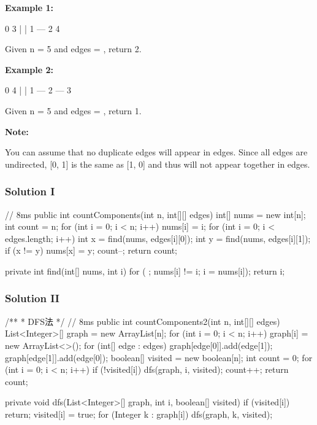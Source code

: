 \textbf{Example 1:}
\begin{Code}
     0          3
     |          |
     1 --- 2    4
\end{Code}

Given n = 5 and edges = \code{[[0, 1], [1, 2], [3, 4]]}, return 2.

\textbf{Example 2:}

\begin{Code}
     0           4
     |           |
     1 --- 2 --- 3
\end{Code}

Given n = 5 and edges = \code{[[0, 1], [1, 2], [2, 3], [3, 4]]}, return 1.

\textbf{Note:}

You can assume that no duplicate edges will appear in edges. Since all edges are undirected, [0, 1] is the same as [1, 0] and thus will not appear together in edges.

\subsubsection{Solution I}

\begin{Code}
// 8ms
public int countComponents(int n, int[][] edges) {
    int[] nums = new int[n];
    int count = n;
    for (int i = 0; i < n; i++) {
        nums[i] = i;
    }
    for (int i = 0; i < edges.length; i++) {
        int x = find(nums, edges[i][0]);
        int y = find(nums, edges[i][1]);
        if (x != y) {
            nums[x] = y;
            count--;
        }
    }
    return count;
}

private int find(int[] nums, int i) {
    for ( ; nums[i] != i; i = nums[i]);
    return i;
}
\end{Code}

\newpage

\subsubsection{Solution II}

\begin{Code}
/**
 * DFS法
 */
// 8ms
public int countComponents2(int n, int[][] edges) {
    List<Integer>[] graph = new ArrayList[n];
    for (int i = 0; i < n; i++) {
        graph[i] = new ArrayList<>();
    }
    for (int[] edge : edges) {
        graph[edge[0]].add(edge[1]);
        graph[edge[1]].add(edge[0]);
    }
    boolean[] visited = new boolean[n];
    int count = 0;
    for (int i = 0; i < n; i++) {
        if (!visited[i]) {
            dfs(graph, i, visited);
            count++;
        }
    }
    return count;
}

private void dfs(List<Integer>[] graph, int i, boolean[] visited) {
    if (visited[i]) {
        return;
    }
    visited[i] = true;
    for (Integer k : graph[i]) {
        dfs(graph, k, visited);
    }
}
\end{Code}

